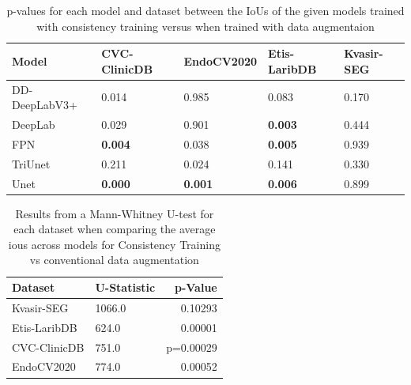 \begin{table}[htb]
    \centering
    \begin{tabularx}{\linewidth}{lXXXX}
    \toprule
      Model & CVC-ClinicDB & EndoCV2020 & Etis-LaribDB & Kvasir-SEG\\
      \midrule
      DD-DeepLabV3+ & 0.014 & 0.985 & 0.083 & 0.170\\
      DeepLab       & 0.029 & 0.901 & \textbf{0.003} & 0.444\\
      FPN           & \textbf{0.004} & 0.038 & \textbf{0.005} & 0.939\\
      TriUnet       & 0.211 & 0.024 & 0.141 & 0.330\\
      Unet          & \textbf{0.000} & \textbf{0.001} & \textbf{0.006} & 0.899\\
      \bottomrule
    \end{tabularx}
    \caption[T-test results consistency training]{p-values for each model and dataset between the IoUs of the given models trained with consistency training versus when trained with data augmentaion}
    \label{tab:ttest_per_dataset_consistency}
\end{table}
\begin{table}[htb]
    \centering
    \begin{tabularx}{\linewidth}{lXr}
            \toprule
            Dataset & U-Statistic & p-Value \\
            \midrule
            Kvasir-SEG & 1066.0 & 0.10293 \\
            Etis-LaribDB & 624.0 & 0.00001\\
            CVC-ClinicDB & 751.0& p=0.00029 \\
            EndoCV2020 & 774.0 & 0.00052    \\
            \bottomrule
        \end{tabularx}
        \caption[Mann-Whitney U-test results consistency training averaged across models]{Results from a Mann-Whitney U-test for each dataset when comparing the average \glspl{iou} across models for Consistency Training vs conventional data augmentation}
        \label{tab:ttest_avgs_consistency}
    \end{table}
    
